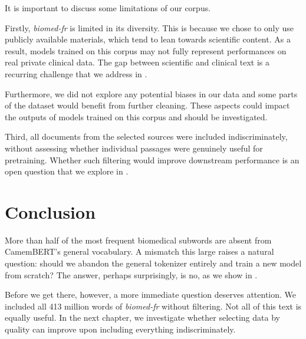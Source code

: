 \begin{reviewread}
It is important to discuss some limitations of our corpus.
\end{reviewread}

\begin{reviewread}
Firstly, \textit{biomed-fr} is limited in its diversity. This is because we chose to only use publicly available materials, which tend to lean towards scientific content. As a result, models trained on this corpus may not fully represent performances on real private clinical data. The gap between scientific and clinical text is a recurring challenge that we address in .
\end{reviewread}

\begin{reviewread}
Furthermore, we did not explore any potential biases in our data and some parts of the dataset would benefit from further cleaning. These aspects could impact the outputs of models trained on this corpus and should be investigated.
\end{reviewread}

\begin{reviewread}
Third, all documents from the selected sources were included indiscriminately, without assessing whether individual passages were genuinely useful for pretraining. Whether such filtering would improve downstream performance is an open question that we explore in .
\end{reviewread}


\section*{Conclusion}

\begin{reviewread}
More than half of the most frequent biomedical subwords are absent from CamemBERT's general vocabulary. A mismatch this large raises a natural question: should we abandon the general tokenizer entirely and train a new model from scratch? The answer, perhaps surprisingly, is no, as we show in .
\end{reviewread}

\vspace{2em}

\begin{reviewread}
Before we get there, however, a more immediate question deserves attention. We included all 413 million words of \textit{biomed-fr} without filtering. Not all of this text is equally useful. In the next chapter, we investigate whether selecting data by quality can improve upon including everything indiscriminately.
\end{reviewread}
